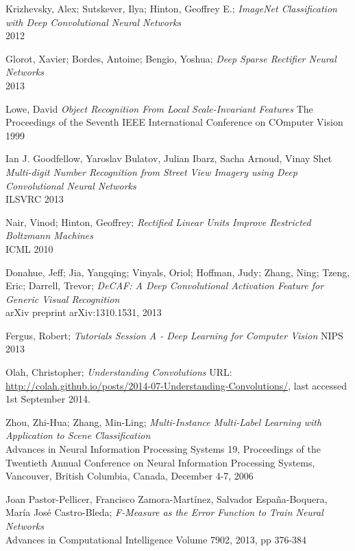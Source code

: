 \documentclass[a4paper,11pt]{article}
\begin{document}
\begin{thebibliography}{1}

 Krizhevsky, Alex; Sutskever, Ilya; Hinton, Geoffrey E.;
 \emph{ImageNet Classification with Deep Convolutional Neural Networks}\\
 2012

 Glorot, Xavier; Bordes, Antoine; Bengio, Yoshua;
 \emph{Deep Sparse Rectifier Neural Networks}\\
 2013
 
 Lowe, David
 \emph{Object Recognition From Local Scale-Invariant Features}
 The Proceedings of the Seventh IEEE International Conference on COmputer Vision
 1999 
 
 Ian J. Goodfellow, Yaroslav Bulatov, Julian Ibarz, Sacha Arnoud, Vinay Shet
  \emph{Multi-digit Number Recognition from Street View Imagery using Deep Convolutional Neural Networks}\\
  ILSVRC 2013

 Nair, Vinod; Hinton, Geoffrey;
  \emph{Rectified Linear Units Improve Restricted Boltzmann Machines}\\
  ICML 2010

 Donahue, Jeff; Jia, Yangqing; Vinyals, Oriol; Hoffman, Judy; Zhang, Ning; Tzeng, Eric; Darrell, Trevor;
  \emph{DeCAF: A Deep Convolutional Activation Feature for Generic Visual Recognition}\\
  arXiv preprint arXiv:1310.1531, 2013
  
 Fergus, Robert;
 \emph{Tutorials Session A - Deep Learning for Computer Vision}
 NIPS 2013  
  
 Olah, Christopher;
 \emph{Understanding Convolutions}
 URL: \url{http://colah.github.io/posts/2014-07-Understanding-Convolutions/}, last accessed 1st September 2014.

 Zhou, Zhi-Hua; Zhang, Min-Ling;
  \emph{Multi-Instance Multi-Label Learning with Application to Scene Classification}\\
  Advances in Neural Information Processing Systems 19, 
  Proceedings of the Twentieth Annual Conference on Neural Information Processing Systems, 
  Vancouver, British Columbia, Canada, 
  December 4-7, 2006

 Joan Pastor-Pellicer, Francisco Zamora-Martínez, Salvador España-Boquera, María José Castro-Bleda;
 \emph{F-Measure as the Error Function to Train Neural Networks}\\
 Advances in Computational Intelligence
 Volume 7902, 2013, pp 376-384


\end{thebibliography}
\end{document}

